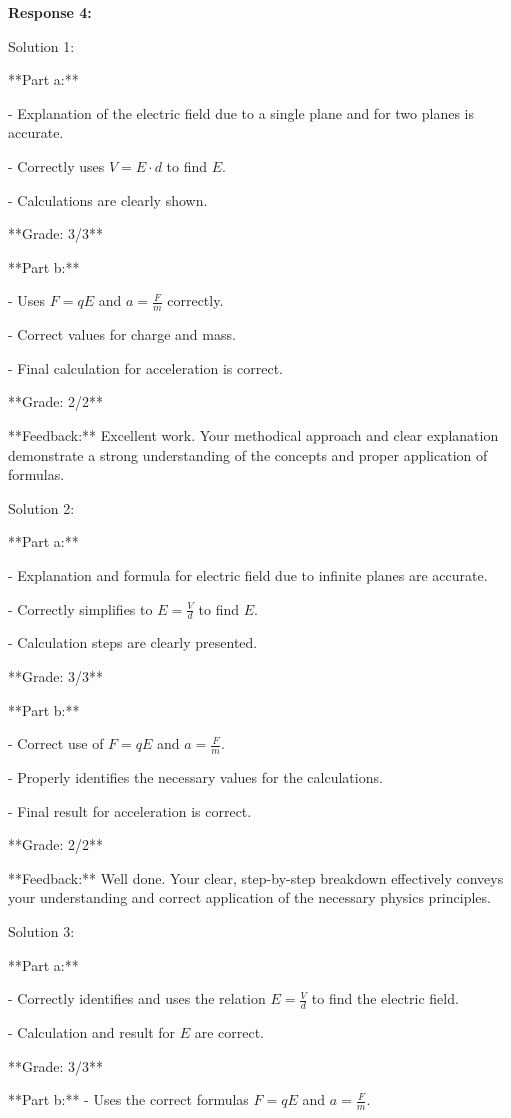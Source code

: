 \documentclass[a4paper,11pt]{article}
\begin{document}
\bigskip
\textbf{Response 4:}

Solution 1:

**Part a:**

- Explanation of the electric field due to a single plane and for two planes is accurate.

- Correctly uses \( V = E \cdot d \) to find \( E \).

- Calculations are clearly shown.

**Grade: 3/3**

**Part b:**

- Uses \( F = qE \) and \( a = \frac{F}{m} \) correctly.

- Correct values for charge and mass.

- Final calculation for acceleration is correct.

**Grade: 2/2**

**Feedback:** Excellent work. Your methodical approach and clear explanation demonstrate a strong understanding of the concepts and proper application of formulas.

Solution 2:

**Part a:**

- Explanation and formula for electric field due to infinite planes are accurate.

- Correctly simplifies to \( E = \frac{V}{d} \) to find \( E \).

- Calculation steps are clearly presented.

**Grade: 3/3**

**Part b:**

- Correct use of \( F = qE \) and \( a = \frac{F}{m} \).

- Properly identifies the necessary values for the calculations.

- Final result for acceleration is correct.

**Grade: 2/2**

**Feedback:** Well done. Your clear, step-by-step breakdown effectively conveys your understanding and correct application of the necessary physics principles.

Solution 3:

**Part a:**

- Correctly identifies and uses the relation \( E = \frac{V}{d} \) to find the electric field.

- Calculation and result for \( E \) are correct.

**Grade: 3/3**

**Part b:**
- Uses the correct formulas \( F = qE \) and \( a = \frac{F}{m} \).
\end{document}
